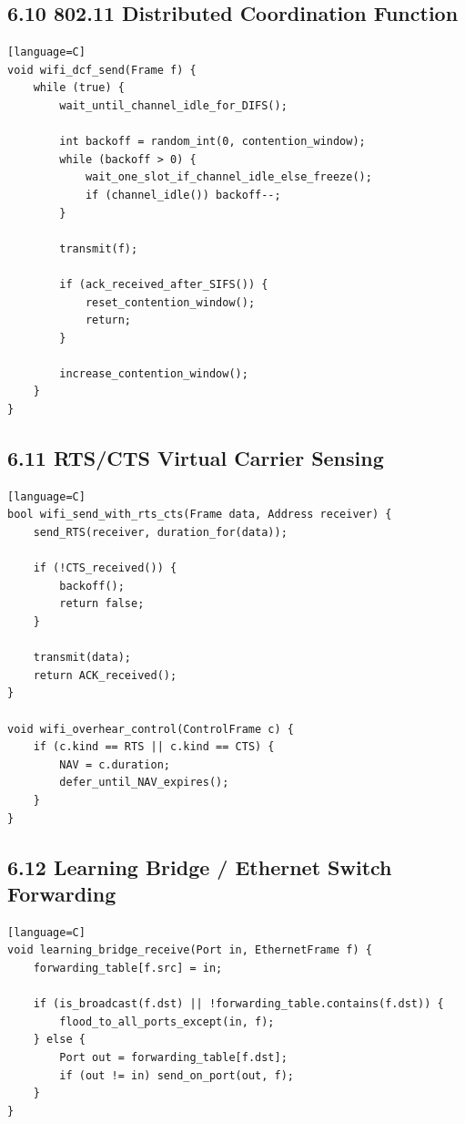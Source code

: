 \documentclass[11pt]{article}
\begin{document}
\subsection{6.10 802.11 Distributed Coordination
Function}\label{distributed-coordination-function}

\begin{verbatim}[language=C]
void wifi_dcf_send(Frame f) {
    while (true) {
        wait_until_channel_idle_for_DIFS();

        int backoff = random_int(0, contention_window);
        while (backoff > 0) {
            wait_one_slot_if_channel_idle_else_freeze();
            if (channel_idle()) backoff--;
        }

        transmit(f);

        if (ack_received_after_SIFS()) {
            reset_contention_window();
            return;
        }

        increase_contention_window();
    }
}
\end{verbatim}

\subsection{6.11 RTS/CTS Virtual Carrier
Sensing}\label{rtscts-virtual-carrier-sensing}

\begin{verbatim}[language=C]
bool wifi_send_with_rts_cts(Frame data, Address receiver) {
    send_RTS(receiver, duration_for(data));

    if (!CTS_received()) {
        backoff();
        return false;
    }

    transmit(data);
    return ACK_received();
}

void wifi_overhear_control(ControlFrame c) {
    if (c.kind == RTS || c.kind == CTS) {
        NAV = c.duration;
        defer_until_NAV_expires();
    }
}
\end{verbatim}

\subsection{6.12 Learning Bridge / Ethernet Switch
Forwarding}\label{learning-bridge-ethernet-switch-forwarding}

\begin{verbatim}[language=C]
void learning_bridge_receive(Port in, EthernetFrame f) {
    forwarding_table[f.src] = in;

    if (is_broadcast(f.dst) || !forwarding_table.contains(f.dst)) {
        flood_to_all_ports_except(in, f);
    } else {
        Port out = forwarding_table[f.dst];
        if (out != in) send_on_port(out, f);
    }
}
\end{verbatim}
\end{document}
